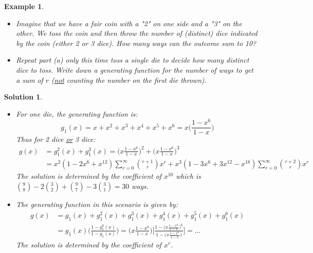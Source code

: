 \documentclass[12pt, letterpaper, onecolumn, conference, final]{IEEEtran}
\theoremstyle{definition}
\theoremstyle{plain}
\newtheorem{example}{Example}[section]
\newtheorem{solution}{Solution}[section]
\begin{document}
\newpage
\begin{example}
\hfill
\begin{itemize}

\item[(a)]
Imagine that we have a fair coin with a "2" on one side and a "3" on the other. We toss the coin and then throw the number of (distinct) dice indicated by the coin (either 2 or 3 dice). How many ways can the outcome sum to 10?

\vspace{.2cm}
\item[(b)]
Repeat part (a) only this time toss a single die to decide how many distinct dice to toss. Write down a generating function for the number of ways to get a sum of $r$ (\underline{not} counting the number on the first die thrown).

\end{itemize}
\end{example}
\begin{solution}
\hfill
\begin{itemize}

\item[(a)]
For one die, the generating function is:
\begin{equation*}
g_1(x) = x + x^2 + x^3 + x^4 + x^5 + x^6 = x \Big( \frac{1-x^6}{1-x} \Big)
\end{equation*}
Thus for 2 dice \underline{or} 3 dice:
\begin{equation*}
\begin{split}
g(x) &= g_1^2(x) + g_1^3(x) = \Big( x \frac{1-x^6}{1-x} \Big)^2 + \Big( x \frac{1-x^6}{1-x} \Big)^3 \\
&= x^2(1 - 2x^6 + x^{12}) \sum_{r=0}^\infty {r+1 \choose r} x^r + x^3(1 - 3x^6 + 3x^{12} - x^{18}) \sum_{r=0}^\infty {r+2 \choose r} x^r
\end{split}
\end{equation*}
The solution is determined by the coefficient of $x^{10}$ which is ${9 \choose 8} - 2{3 \choose 2} + {9 \choose 7} - 3{3 \choose 1} = 30$ ways.

\vspace{.2cm}
\item[(b)]
The generating function in this scenario is given by:
\begin{equation*}
\begin{split}
g(x) &= g_1(x) + g_1^2(x) + g_1^3(x) + g_1^4(x) + g_1^5(x) + g_1^6(x) \\
&= g_1(x) \Big( \frac{1-g_1^6(x)}{1-g_1(x)} \Big) = \Big( x \frac{1-x^6}{1-x} \Big) \Bigg[ \frac{1 - \Big( x \frac{1-x^6}{1-x} \Big)^6}{1 - \Big( x \frac{1-x^6}{1-x} \Big)} \Bigg] = \dots
\end{split}
\end{equation*}
The solution is determined by the coefficient of $x^r$.

\end{itemize}
\end{solution}
\end{document}
